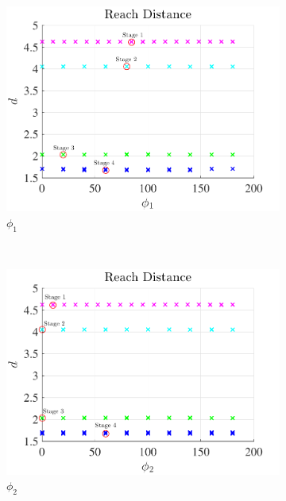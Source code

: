 \documentclass[]{aiaa-tc}%
\begin{document}
\begin{figure}[htbp] 
    \centering 
    \begin{subfigure}[htbp]{0.3\textwidth} 
        \includegraphics[width=\textwidth]{figures/phi1.pdf} 
        \caption{ \( \phi_1 \)} \label{fig:phi1} 
    \end{subfigure}~
    \begin{subfigure}[htbp]{0.3\textwidth} 
        \includegraphics[width=\textwidth]{figures/phi2.pdf} 
        \caption{\( \phi_2 \)} \label{fig:phi2} 
    \end{subfigure}~
    \begin{subfigure}[htbp]{0.3\textwidth} 

\end{subfigure}
\end{figure}
\end{document}
